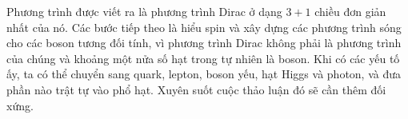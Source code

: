 \begin{classroomqa}
\end{classroomqa}

Phương trình được viết ra là phương trình Dirac ở dạng \(3+1\) chiều đơn giản nhất của nó. Các bước tiếp theo là hiểu spin và xây dựng các phương trình sóng cho các boson tương đối tính, vì phương trình Dirac không phải là phương trình của chúng và khoảng một nửa số hạt trong tự nhiên là boson. Khi có các yếu tố ấy, ta có thể chuyển sang quark, lepton, boson yếu, hạt Higgs và photon, và đưa phần nào trật tự vào phổ hạt. Xuyên suốt cuộc thảo luận đó sẽ cần thêm đối xứng.
